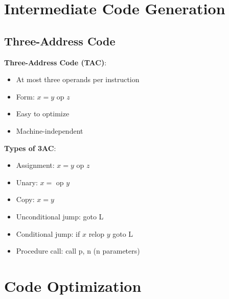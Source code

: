 \documentclass[12pt,a4paper]{report}
\begin{document}
\section{Intermediate Code Generation}

\subsection{Three-Address Code}
\begin{concept}
\textbf{Three-Address Code (TAC)}:
\begin{itemize}
    \item At most three operands per instruction
    \item Form: $x = y$ op $z$
    \item Easy to optimize
    \item Machine-independent
\end{itemize}

\textbf{Types of 3AC}:
\begin{itemize}
    \item Assignment: $x = y$ op $z$
    \item Unary: $x = $ op $y$
    \item Copy: $x = y$
    \item Unconditional jump: goto L
    \item Conditional jump: if $x$ relop $y$ goto L
    \item Procedure call: call p, n (n parameters)
\end{itemize}
\end{concept}

\section{Code Optimization}
\end{document}
